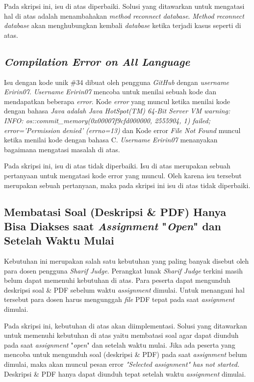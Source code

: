 Pada skripsi ini, isu di atas diperbaiki. Solusi yang ditawarkan untuk mengatasi hal di atas adalah menambahakan \textit{method reconnect database}. \textit{Method reconnect database} akan menghubungkan kembali \textit{database} ketika terjadi kasus seperti di atas.

\subsection{\textit{Compilation Error on All Language}}
Isu dengan kode unik \#34 dibuat oleh pengguna \textit{GitHub} dengan \textit{username} \textit{Eririn07}. \textit{Username} \textit{Eririn07} mencoba untuk menilai sebuah kode dan mendapatkan beberapa \textit{error}. Kode \textit{error} yang muncul ketika menilai kode dengan bahasa \textit{Java adalah Java HotSpot(TM) 64-Bit Server VM warning: INFO: os::commit\_memory(0x00007f9cfd000000, 2555904, 1) failed; error='Permission denied' (errno=13)} dan Kode error \textit{File Not Found} muncul ketika menilai kode dengan bahasa C. \textit{Username} \textit{Eririn07} menanyakan bagaimana mengatasi masalah di atas.

Pada skripsi ini, isu di atas tidak diperbaiki. Isu di atas merupakan sebuah pertanyaan untuk mengatasi kode error yang muncul. Oleh karena isu tersebut merupakan sebuah pertanyaan, maka pada skripsi ini isu di atas tidak diperbaiki.

\subsection{Membatasi Soal (Deskripsi \& PDF) Hanya Bisa Diakses saat \textit{Assignment} "\textit{Open}" dan Setelah Waktu Mulai}
\label{subsec:membatasisoal}
Kebutuhan ini merupakan salah satu kebutuhan yang paling banyak disebut oleh para dosen pengguna \textit{Sharif Judge}. Perangkat lunak \textit{Sharif Judge} terkini masih belum dapat memenuhi kebutuhan di atas. Para peserta dapat mengunduh deskripsi soal \& PDF sebelum waktu \textit{assignment} dimulai. Untuk menangani hal tersebut para dosen harus mengunggah \textit{file} PDF tepat pada saat \textit{assignment} dimulai. 

Pada skripsi ini, kebutuhan di atas akan diimplementasi. Solusi yang ditawarkan untuk memenuhi kebutuhan di atas yaitu membatasi soal agar dapat diunduh pada saat \textit{assignment} "\textit{open}" dan setelah waktu mulai. Jika ada peserta yang mencoba untuk mengunduh soal (deskripsi \& PDF) pada saat \textit{assignment} belum dimulai, maka akan muncul pesan error \textit{"Selected \textit{assignment"} has not started.} Deskripsi \& PDF hanya dapat diunduh tepat setelah waktu \textit{assignment} dimulai.

